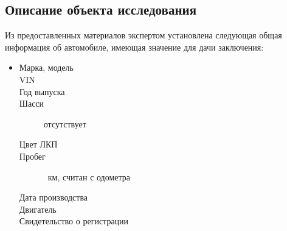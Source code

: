 \setcounter{page}{1}




\subsection{Описание объекта исследования}

	\par Из предоставленных материалов   экспертом установлена следующая общая информация об автомобиле, имеющая значение для дачи заключения:
 \parbox[]{10cm}{}
\begin{itemize}
	\item[ ] 
	\begin{description}
		\item[Марка, модель] \hfill {}
		\item[VIN] \hfill \vin
		\item[Год выпуска] \hfill {}
		\item[Шасси] \hfill отсутствует
		\item[Цвет ЛКП] \hfill {}
		\item[Пробег] \hfill  {}\, км, считан с одометра
        \item[Дата производства] \hfill {}
		\item[Двигатель] \hfill {}
		\item[Свидетельство о регистрации] \hfill {}
	\end{description}
\end{itemize}


